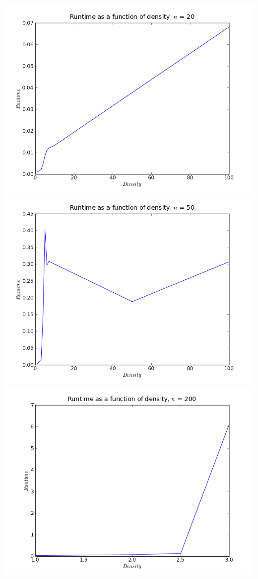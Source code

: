 \documentclass{article}
\begin{document}
\includegraphics[scale=0.5]{timen20.png}
\includegraphics[scale=0.5]{timen50.png}
\includegraphics[scale=0.5]{timen200.png}
\end{document}

